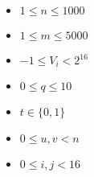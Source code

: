 \begin{itemize}
\item $1 \le n \le 1000$
\item $1 \le m \le 5000$
\item $-1 \le V_i < 2^{16}$
\item $0 \le q \le 10$
\item $t \in \{0, 1\}$
\item $0 \le u, v < n$
\item $0 \le i, j < 16$
\end{itemize}
